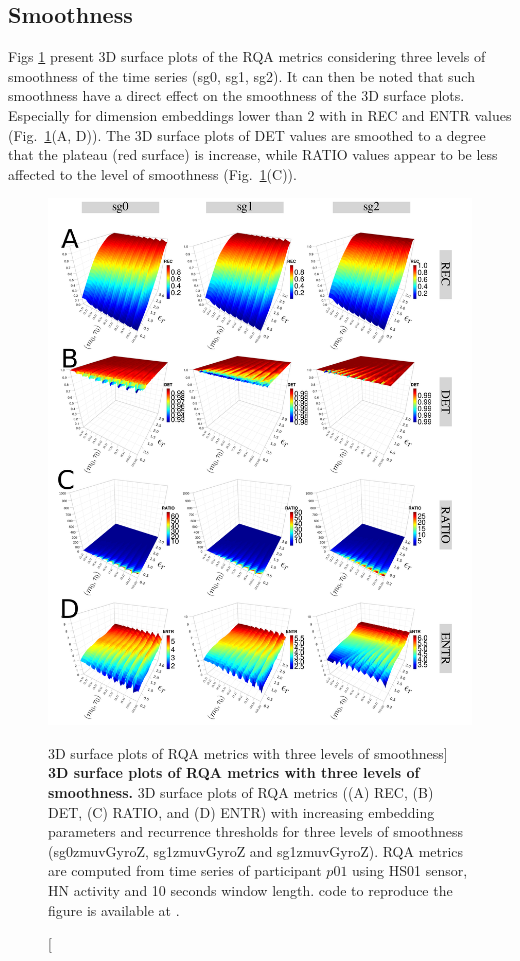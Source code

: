 \subsection{Smoothness}
Figs \ref{fig:topo_smoothness} present 3D surface plots of the RQA metrics
considering three levels of smoothness of the time series (sg0, sg1, sg2).
It can then be noted that such smoothness have a direct effect on the 
smoothness of the 3D surface plots.
Especially for dimension embeddings lower than 2 with in REC and ENTR values 
(Fig.~\ref{fig:topo_smoothness}(A, D)).
The 3D surface plots of DET values are smoothed to a degree that the plateau 
(red surface) is increase, while RATIO values appear to be less 
affected to the level of smoothness (Fig.~\ref{fig:topo_smoothness}(C)).
\begin{figure}
\centering
\includegraphics[width=1.0\textwidth]{fig_6_13}
    \caption
	[3D surface plots of RQA metrics with three levels of smoothness]{
	{\bf 3D surface plots of RQA metrics with three levels of smoothness.}
	3D surface plots of RQA metrics ((A) REC, (B) DET, (C) RATIO, and (D) ENTR) 
	with increasing embedding parameters and recurrence thresholds for 
	three levels of smoothness 
	(sg0zmuvGyroZ, sg1zmuvGyroZ and sg1zmuvGyroZ).
	RQA metrics are computed from time series of participant $p01$ using 
	HS01 sensor, HN activity and 10 seconds window length.
	\R code to reproduce the figure is available at 
	.
 	}
\label{fig:topo_smoothness}
\end{figure}

